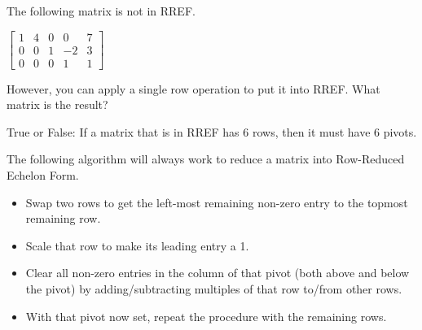 \edXsolution{  }

\endedxproblem




The following matrix is not in RREF.


$\left[ \begin{array}{ccccc} 1 & 4 & 0 & 0 & 7 \\
0 & 0 & 1 & -2 & 3 \\
0 & 0 & 0 & 1 & 1
 \end{array} \right]$

However, you can apply a single row operation to put it into RREF.  What matrix is the
result?  





\edXsolution{  }

\endedxproblem




True or False: If a matrix that is in RREF has 6 rows, then it must have 6 pivots.  



\edXsolution{  }

\endedxproblem

\endedxvertical







The following algorithm will always work to reduce a matrix into Row-Reduced Echelon Form.  

\begin{itemize}
\item Swap two rows to get the left-most remaining non-zero entry to the topmost remaining row.  
\item Scale that row to make its leading entry a 1.    
\item Clear all non-zero entries in the column of that pivot (both above and below the pivot) by adding/subtracting multiples of that row to/from other rows.  
\item With that pivot now set, repeat the procedure with the remaining rows.  
\end{itemize}

